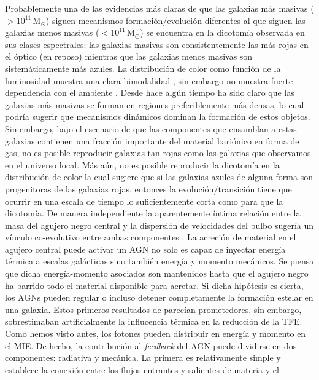 \documentclass{article}
\begin{document}
\begin{description}
Probablemente una de las evidencias más claras de que las galaxias más masivas
($>10^{11}\,$M$_\odot$) siguen mecanismos formación/evolución diferentes al que siguen las galaxias
menos masivas ($<10^{11}\,$M$_\odot$) se encuentra en la dicotomía observada en sus clases
espectrales: las galaxias masivas son consistentemente las más rojas en el óptico (en reposo)
mientras que las galaxias menos masivas son sistemáticamente más azules. La distribución de color
como función de la luminosidad muestra una clara bimodalidad \citep{Strateva2001, Baldry2004,
Balogh2004}, sin embargo no muestra fuerte dependencia con el ambiente \citep[medido usando la
densidad local, e.\,g.,][]{Balogh2004}. Desde hace algún tiempo ha sido claro que las galaxias más
masivas se forman en regiones preferiblemente más densas, lo cual podría sugerir que mecanismos
dinámicos dominan la formación de estos objetos. Sin embargo, bajo el escenario de que las
componentes que ensamblan a estas galaxias contienen una fracción importante del material bariónico
en forma de gas, no es posible reproducir galaxias tan rojas como las galaxias que observamos en el
universo local. Más aún, no es posible reproducir la dicotomía en la distribución de color la cual
sugiere que si las galaxias azules de alguna forma son progenitoras de las galaxias rojas, entonces
la evolución/transición tiene que ocurrir en una escala de tiempo lo suficientemente corta como para
que la dicotomía.
De manera independiente la aparentemente íntima relación entre la masa del agujero negro central y
la dispersión de velocidades del bulbo sugería un vínculo co-evolutivo entre ambas componentes
\citep{Ferrarese2000, Tremaine2002}. La acreción de material en el agujero central puede activar un
AGN no solo es capaz de inyectar energía térmica a escalas galácticas sino también energía y momento
mecánicos. Se piensa que dicha energía-momento asociados son mantenidos hasta que el agujero negro
ha barrido todo el material disponible para acretar. Si dicha hipótesis es cierta, los AGNs pueden
regular o incluso detener completamente la formación estelar en una galaxia.
Estos primeros resultados de \citet{Springel2005a} parecían prometedores, sin embargo, sobrestimaban
artificialmente la influcencia térmica en la reducción de la TFE. Como hemos visto antes, los
fotones pueden distribuir en energía y momento en el MIE. De hecho, la contribución al
\emph{feedback} del AGN puede dividirse en dos componentes: radiativa y mecánica. La primera es
relativamente simple y establece la conexión entre los flujos entrantes y salientes de materia y el

\end{description}
\end{document}
